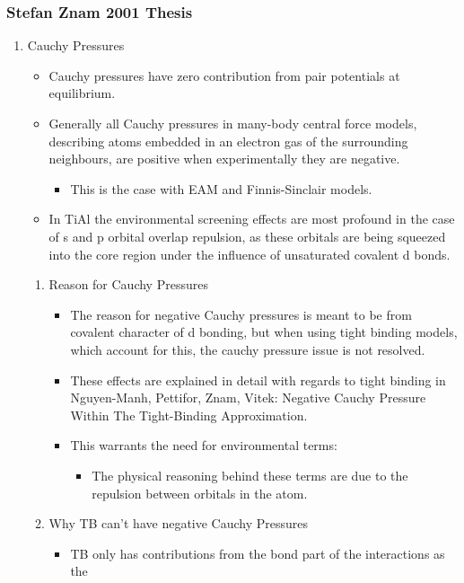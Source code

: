 \documentclass[11pt]{article}
\begin{document}
\subsubsection{Stefan Znam 2001 Thesis}
\label{sec:org2b4d2c9}
\begin{enumerate}
\item Cauchy Pressures
\label{sec:org3426413}
\begin{itemize}
\item Cauchy pressures have zero contribution from pair potentials at
equilibrium.
\item Generally all Cauchy pressures in many-body central force models,
describing atoms embedded in an electron gas of the surrounding
neighbours, are positive when experimentally they are negative.
\begin{itemize}
\item This is the case with EAM and Finnis-Sinclair models.
\end{itemize}
\item In TiAl the environmental screening effects are most profound in the
case of s and p orbital overlap repulsion, as these orbitals are being
squeezed into the core region under the influence of unsaturated
covalent d bonds.
\end{itemize}
\begin{enumerate}
\item Reason for Cauchy Pressures
\label{sec:orge49df6b}
\begin{itemize}
\item The reason for negative Cauchy pressures is meant to be from covalent
character of d bonding, but when using tight binding models, which
account for this, the cauchy pressure issue is not resolved.
\item These effects are explained in detail with regards to tight binding in
Nguyen-Manh, Pettifor, Znam, Vitek: Negative Cauchy Pressure Within
The Tight-Binding Approximation.
\item This warrants the need for environmental terms:
\begin{itemize}
\item The physical reasoning behind these terms are due to the repulsion
between orbitals in the atom.
\end{itemize}
\end{itemize}
\item Why TB can't have negative Cauchy Pressures
\label{sec:org66a95d7}
\begin{itemize}
\item TB only has contributions from the bond part of the interactions as the

\end{itemize}
\end{enumerate}
\end{enumerate}
\end{document}
